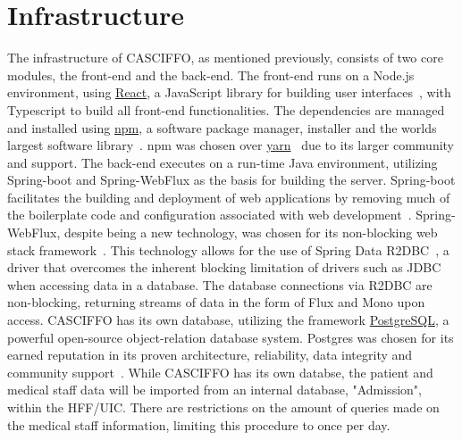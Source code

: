 \section{Infrastructure}
\label{sec:infrastructure}
The infrastructure of CASCIFFO, as mentioned previously, consists of two core modules, the front-end and the back-end.  
The front-end runs on a Node.js environment, using \href{https://reactjs.org/}{React}, a JavaScript library for building user interfaces~\cite{reactjs},  with Typescript to build all front-end functionalities. The dependencies are managed and installed using \href{https://docs.npmjs.com/about-npm}{npm}, a software package manager, installer and the worlds largest software library~\cite{npm}. npm was chosen over \href{https://yarnpkg.com/}{yarn}~\cite{yarn} due to its larger community and support.
The back-end executes on a run-time Java environment, utilizing Spring-boot and Spring-WebFlux as the basis for building the server. Spring-boot facilitates the building and deployment of web applications by removing much of the boilerplate code and configuration associated with web development~\cite{spring-boot}. Spring-WebFlux, despite being a new technology, was chosen for its non-blocking web stack framework~\cite{spring-webflux}. This technology allows for the use of Spring Data R2DBC~\cite{r2dbc}, a driver that overcomes the inherent blocking limitation of drivers such as JDBC when accessing data in a database. The database connections via R2DBC are non-blocking, returning streams of data in the form of Flux and Mono upon access.
CASCIFFO has its own database, utilizing the framework \href{https://www.postgresql.org/about/}{PostgreSQL}, a powerful open-source object-relation database system. Postgres was chosen for its earned reputation in its proven architecture, reliability, data integrity and community support~\cite{postgresql}. While CASCIFFO has its own databse, the patient and medical staff data will be imported from an internal database, "Admission", within the HFF/UIC. There are restrictions on the amount of queries made on the medical staff information, limiting this procedure to once per day.


